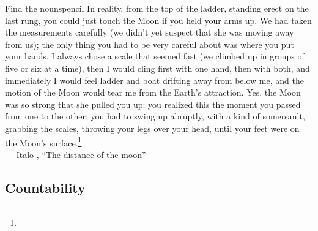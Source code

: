 \begin{tblsframedsymbol}{Find the nouns}{pencil}
    In reality, from the top of the ladder, standing erect on the last rung, you could just touch the Moon if you held your arms up. We had taken the measurements carefully (we didn't yet suspect that she was moving away from us); the only thing you had to be very careful about was where you put your hands. I always chose a scale that seemed fast (we climbed up in groups of five or six at a time), then I would cling first with one hand, then with both, and immediately I would feel ladder and boat drifting away from below me, and the motion of the Moon would tear me from the Earth's attraction. Yes, the Moon was so strong that she pulled you up; you realized this the moment you passed from one to the other: you had to swing up abruptly, with a kind of somersault, grabbing the scales, throwing your legs over your head, until your feet were on the Moon's surface.\footnote{}\\\phantom{~}\hfill~-- Italo \citeauthor{calvino2018}, \enquote{The distance of the moon}

\end{tblsframedsymbol}

\subsection{Countability}\label{sec:count}

